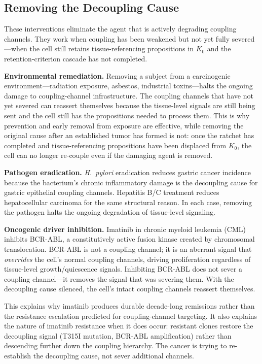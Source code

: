 \documentclass[11pt]{article}
\theoremstyle{definition}
\theoremstyle{remark}
\begin{document}
\subsection{Removing the Decoupling Cause}

These interventions eliminate the agent that is actively degrading
coupling channels. They work when coupling has been weakened but not
yet fully severed---when the cell still retains tissue-referencing
propositions in $K_0$ and the retention-criterion cascade has not
completed.

\textbf{Environmental remediation.}
Removing a subject from a carcinogenic environment---radiation
exposure, asbestos, industrial toxins---halts the ongoing damage to
coupling-channel infrastructure. The coupling channels that have not
yet severed can reassert themselves because the tissue-level signals
are still being sent and the cell still has the propositions needed
to process them. This is why prevention and early removal from
exposure are effective, while removing the original cause after an
established tumor has formed is not: once the ratchet has completed
and tissue-referencing propositions have been displaced from $K_0$,
the cell can no longer re-couple even if the damaging agent is
removed.

\textbf{Pathogen eradication.}
\emph{H.~pylori} eradication reduces gastric cancer incidence
because the bacterium's chronic inflammatory damage is the
decoupling cause for gastric epithelial coupling channels. Hepatitis
B/C treatment reduces hepatocellular carcinoma for the same
structural reason. In each case, removing the pathogen halts the
ongoing degradation of tissue-level signaling.

\textbf{Oncogenic driver inhibition.}
Imatinib in chronic myeloid leukemia (CML) inhibits BCR-ABL, a
constitutively active fusion kinase created by chromosomal
translocation. BCR-ABL is not a coupling channel; it is an aberrant
signal that \emph{overrides} the cell's normal coupling channels,
driving proliferation regardless of tissue-level growth/quiescence
signals. Inhibiting BCR-ABL does not sever a coupling channel---it
removes the signal that was severing them. With the decoupling cause
silenced, the cell's intact coupling channels reassert themselves.

This explains why imatinib produces durable decade-long remissions
rather than the resistance escalation predicted for coupling-channel
targeting. It also explains the nature of imatinib resistance when
it does occur: resistant clones restore the decoupling signal
(T315I mutation, BCR-ABL amplification) rather than descending
further down the coupling hierarchy. The cancer is trying to
re-establish the decoupling cause, not sever additional channels.
\end{document}
